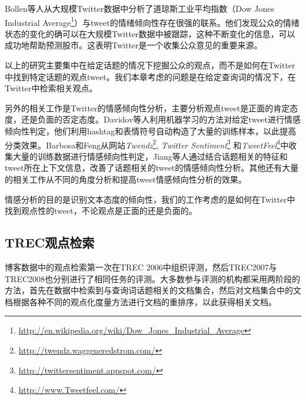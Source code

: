 Bollen等人从大规模Twitter数据中分析了道琼斯工业平均指数（Dow Jones Industrial Average\footnote{\url{http://en.wikipedia.org/wiki/Dow_Jones_Industrial_Average}}）与tweet的情绪倾向性存在很强的联系。他们发现公众的情绪状态的变化的确可以在大规模Twitter数据中被跟踪，这种不断变化的信息，可以成功地帮助预测股市。这表明Twitter是一个收集公众意见的重要来源。

以上的研究主要集中在给定话题的情况下挖掘公众的观点，而不是如何在Twitter中找到特定话题的观点tweet。我们本章考虑的问题是在给定查询词的情况下，在Twitter中检索相关观点。

另外的相关工作是Twitter的情感倾向性分析，主要分析观点tweet是正面的肯定态度，还是负面的否定态度。Davidov等人利用机器学习的方法对给定tweet进行情感倾向性判定，他们利用hashtag和表情符号自动构造了大量的训练样本，以此提高分类效果。Barbosa和Feng从网站\emph{Twendz}\footnote{\url{http://twendz.waggeneredstrom.com/}}, \emph{Twitter Sentiment}\footnote{\url{http://twittersentiment.appspot.com/}} 和\emph{TweetFeel}\footnote{\url{http://www.Tweetfeel.com/}}中收集大量的训练数据进行情感倾向性判定，Jiang等人通过结合话题相关的特征和tweet所在上下文信息，改善了话题相关的tweet的情感倾向性分析。其他还有大量的相关工作从不同的角度分析和提高tweet情感倾向性分析的效果。

情感分析的目的是识别文本态度的倾向性，我们的工作考虑的是如何在Twitter中找到观点性的tweet，不论观点是正面的还是负面的。

\subsection{TREC观点检索}
博客数据中的观点检索第一次在TREC 2006中组织评测，然后TREC2007与TREC2008也分别进行了相同任务的评测。大多数参与评测的机构都采用两阶段的方法，首先在数据中检索到与查询词话题相关的文档集合，然后对文档集合中的文档根据各种不同的观点化度量方法进行文档的重排序，以此获得相关文档。

